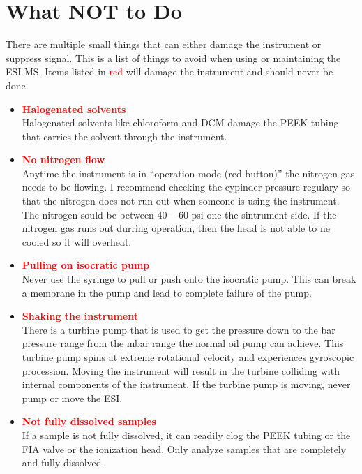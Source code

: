 \documentclass[12pt, letterpaper]{article}
\begin{document}
\section{What NOT to Do}
There are multiple small things that can either damage the instrument or suppress signal.
This is a list of things to avoid when using or maintaining the ESI-MS.
Items listed in \textcolor{red}{red} will damage the instrument and should never be done.
\begin{itemize}

	\item \textbf{\textcolor{red}{Halogenated solvents}}\\
	Halogenated solvents like chloroform and DCM damage the PEEK tubing that carries the solvent through the instrument.
	
	\item \textbf{\textcolor{red}{No nitrogen flow}}\\
	Anytime the instrument is in ``operation mode (red button)'' the nitrogen gas needs to be flowing.
	I recommend checking the cypinder pressure regulary so that the nitrogen does not run out when someone is using the instrument.
	The nitrogen sould be between 40 -- 60 psi one the sintrument side.
	If the nitrogen gas runs out durring operation, then the head is not able to ne cooled so it will overheat.

	
	\item \textbf{\textcolor{red}{Pulling on isocratic pump}}\\
	Never use the syringe to pull or push onto the isocratic pump.
	This can break a membrane in the pump and lead to complete failure of the pump.
	
	\item \textbf{\textcolor{red}{Shaking the instrument}}\\
	There is a turbine pump that is used to get the pressure down to the \textmu bar pressure range from the mbar range the normal oil pump can achieve.
	This turbine pump spins at extreme rotational velocity and experiences gyroscopic procession. 
	Moving the instrument will result in the turbine colliding with internal components of the instrument.
	If the turbine pump is moving, never pump or move the ESI.
	
	\item \textbf{\textcolor{red}{Not fully dissolved samples}}\\
	If a sample is not fully dissolved, it can readily clog the PEEK tubing or the FIA valve or the ionization head.
	Only analyze samples that are completely and fully dissolved.
	

\end{itemize}
\end{document}
